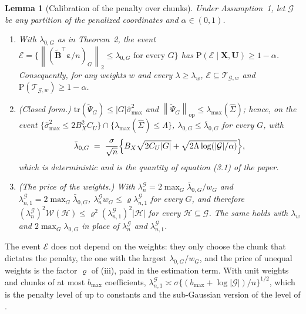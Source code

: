 \documentclass[10pt]{book}
\newtheorem{lemma}{Lemma}[section]
\theoremstyle{definition}
\newcommand{\Prob}{\mathrm{P}}
\newcommand{\T}{^{\top}}
\newcommand{\norm}[1]{\left\lVert #1 \right\rVert}
\newcommand{\bX}{\mathbf{X}}
\newcommand{\bU}{\mathbf{U}}
\newcommand{\Gramhat}{\widehat{\Sigma}}
\newcommand{\pen}{\lambda}
\newcommand{\Bmat}{\mathbf{B}}
\newcommand{\Btil}{\widetilde{\Bmat}}
\newcommand{\bveps}{\boldsymbol{\varepsilon}}
\newcommand{\smax}{\widehat{\sigma}_{\max}}
\newcommand{\lmaxx}{\lambda_{\max}}
\newcommand{\opnorm}[1]{\left\lVert #1 \right\rVert_{\mathrm{op}}}
\newcommand{\Gcal}{\mathcal{G}}
\newcommand{\Hcal}{\mathcal{H}}
\newcommand{\Wcal}{\mathcal{W}}
\newcommand{\Psitil}{\widetilde{\Psi}}
\newcommand{\lamG}{\lambda^{\mathcal{G}}_{n}}
\newcommand{\lamGone}{\lambda^{\mathcal{G}}_{n,1}}
\newcommand{\lamz}[1]{\lambda_{0,#1}}
\newcommand{\lamzbar}[1]{\bar{\lambda}_{0,#1}}
\newcommand{\Tw}{\mathcal{T}_{\mathcal{G},w}}
\newcommand{\Ecal}{\mathcal{E}}
\begin{document}
{\color{colR1}
\begin{lemma}[Calibration of the penalty over chunks]
\label{lem:calib-blocks}
Under Assumption~1, let $\Gcal$ be any partition of the penalized coordinates
and $\alpha \in (0,1)$.
\begin{enumerate}
\item[(i)] With $\lamz{G}$ as in Theorem~2, the event
$\Ecal = \{\norm{(\Btil\T\bveps/n)_{G}}_{2} \le \lamz{G} \text{ for every } G\}$
has $\Prob(\Ecal\mid\bX,\bU) \ge 1-\alpha$. Consequently, for any weights $w$
and every $\pen \ge \pen_{w}$, $\Ecal \subseteq \Tw$ and
$\Prob(\Tw) \ge 1-\alpha$.
\item[(ii)] (Closed form.) $\mathrm{tr}(\Psitil_{G}) \le |G|\smax^{2}$ and
$\opnorm{\Psitil_{G}} \le \lmaxx(\Gramhat)$; hence, on the event
$\{\smax^{2} \le 2B_X^{2}C_U\}\cap\{\lmaxx(\Gramhat) \le \Lambda\}$,
$\lamz{G} \le \lamzbar{G}$ for every $G$, with
\[
  \lamzbar{G} \;=\; \frac{\sigma}{\sqrt{n}}\Bigl\{B_X\sqrt{2C_U|G|}
  + \sqrt{2\Lambda\log(|\Gcal|/\alpha)}\Bigr\},
\]
which is deterministic and is the quantity of equation (3.1) of the paper.
\item[(iii)] (The price of the weights.) With
$\lamG = 2\max_{G}\lamzbar{G}/w_{G}$ and $\lamGone = 2\max_{G}\lamzbar{G}$,
$\lamG w_{G} \le \varrho\lamGone$ for every $G$, and therefore
$(\lamG)^{2}\Wcal(\Hcal) \le \varrho^{2}(\lamGone)^{2}|\Hcal|$ for every
$\Hcal \subseteq \Gcal$. The same holds with $\pen_{w}$ and
$2\max_{G}\lamz{G}$ in place of $\lamG$ and $\lamGone$.
\end{enumerate}
\end{lemma}

The event $\Ecal$ does not depend on the weights: they only choose the chunk
that dictates the penalty, the one with the largest $\lamz{G}/w_{G}$, and the
price of unequal weights is the factor $\varrho$ of (iii), paid in the
estimation term. With unit weights and chunks of at most $b_{\max}$
coefficients, $\lamGone \asymp \sigma\{(b_{\max} + \log|\Gcal|)/n\}^{1/2}$,
which is the penalty level of \citet[eq.~3.14]{Klopp-Pensky-2015} up to
constants and the sub-Gaussian version of the level of
\citet[Lemma~3.1]{Lounici-Pontil-vandeGeer-Tsybakov-2011}.

}
\end{document}
